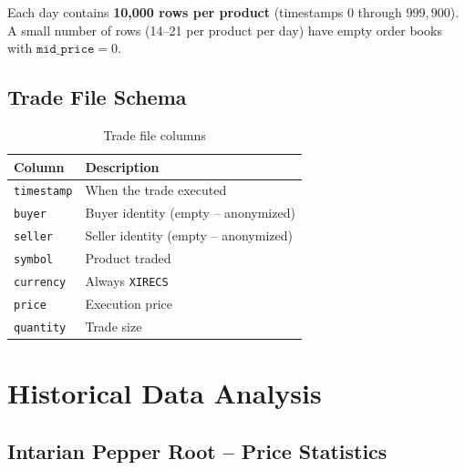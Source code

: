 \documentclass[11pt,a4paper]{article}
\begin{document}
Each day contains \textbf{10,000 rows per product} (timestamps $0$ through $999{,}900$). A small number of rows (14--21 per product per day) have empty order books with $\texttt{mid\_price} = 0$.

\subsection{Trade File Schema}

\begin{table}[H]
\centering
\caption{Trade file columns}
\begin{tabular}{@{}ll@{}}
\toprule
\textbf{Column} & \textbf{Description} \\
\midrule
\texttt{timestamp} & When the trade executed \\
\texttt{buyer}     & Buyer identity (empty -- anonymized) \\
\texttt{seller}    & Seller identity (empty -- anonymized) \\
\texttt{symbol}    & Product traded \\
\texttt{currency}  & Always \texttt{XIRECS} \\
\texttt{price}     & Execution price \\
\texttt{quantity}  & Trade size \\
\bottomrule
\end{tabular}
\end{table}

\section{Historical Data Analysis}

\subsection{Intarian Pepper Root -- Price Statistics}
\end{document}
